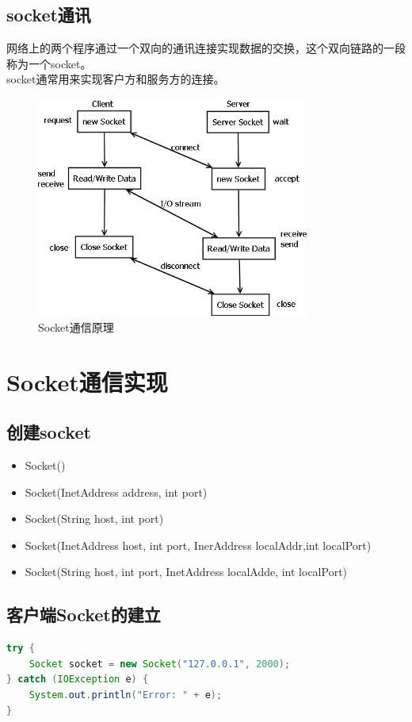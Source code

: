 \subsection{socket通讯}
网络上的两个程序通过一个双向的通讯连接实现数据的交换，这个双向链路的一段称为一个socket。
\\socket通常用来实现客户方和服务方的连接。
\begin{figure}[!h]
	\centering
	\includegraphics[width=0.8\textwidth]{image/socket.png}
	\caption{Socket通信原理}
\end{figure}
\section{Socket通信实现}
\subsection{创建socket}
\begin{itemize}
	\item Socket()
	\item Socket(InetAddress address, int port)
	\item Socket(String host, int port)
	\item Socket(InetAddress host, int port, InerAddress localAddr,int localPort)
	\item Socket(String host, int port, InetAddress localAdde, int localPort)
\end{itemize}
\subsection{客户端Socket的建立}
\begin{lstlisting}[language=java]
try {
	Socket socket = new Socket("127.0.0.1", 2000);
} catch (IOException e) {
	System.out.println("Error: " + e);
}
\end{lstlisting}
